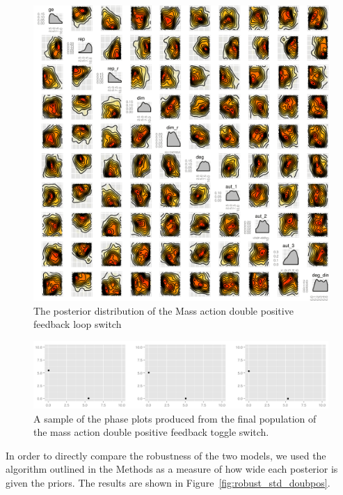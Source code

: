 \begin{figure}[p]
\centering
\includegraphics[scale=0.2]{chapterStabilityFinder/mass_action_switches/deterministic/posterior_ma_dp_bi.png}
\caption{The posterior distribution of the Mass action double positive feedback loop switch}
\label{fig:doub_pos}
\end{figure}

\begin{figure}[p]
\centering
\includegraphics[scale=0.3]{chapterStabilityFinder/mass_action_switches/deterministic/ma_dp_bi_phase_plot.png}
\caption{A sample of the phase plots produced from the final population of the mass action double positive feedback toggle switch.}
\label{fig:det_dp_phase}
\end{figure}

In order to directly compare the robustness of the two models, we used the algorithm outlined in the Methods as a measure of how wide each posterior is given the priors. The results are shown in Figure~\ref{fig:robust_std_doubpos}. 


